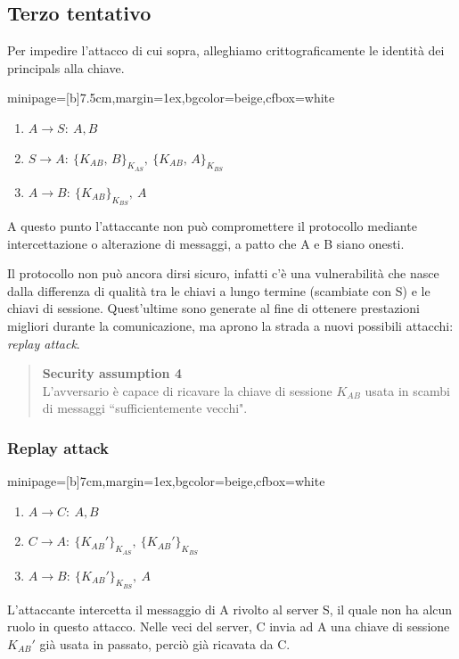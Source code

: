 \documentclass[a4paper, 11pt, notitlepage, fleqn]{report}
\newcommand{\fromto}[2]{#1\rightarrow #2\!:\ }
\newenvironment{colbox}[2]%
{%
	\par\noindent\hspace{10pt}
	\begin{adjustbox}{minipage=[b]{#2},margin=1ex,bgcolor=#1,cfbox=white}
}{%
	\end{adjustbox}\newline%
}
\begin{document}
\subsection{Terzo tentativo}
Per impedire l'attacco di cui sopra, alleghiamo crittograficamente le identità dei principals alla chiave.
\begin{colbox}{beige}{7.5cm}
	\begin{enumerate}
		\item $\fromto{A}{S}A, B$
		\item $\fromto{S}{A}\{K_{AB},\,B\}_{K_{AS}},\ \{K_{AB},\,A\}_{K_{BS}}$
		\item $\fromto{A}{B}\{K_{AB}\}_{K_{BS}},\ A$
	\end{enumerate}
\end{colbox}
A questo punto l'attaccante non può compromettere il protocollo mediante intercettazione o alterazione di messaggi, a patto che A e B siano onesti.

Il protocollo non può ancora dirsi sicuro, infatti c'è una vulnerabilità che nasce dalla differenza di qualità tra le chiavi a lungo termine (scambiate con S) e le chiavi di sessione. Quest'ultime sono generate al fine di ottenere prestazioni migliori durante la comunicazione, ma aprono la strada a nuovi possibili attacchi: \emph{replay attack}.
\begin{quote}
	\textbf{Security assumption 4}\\
	L'avversario è capace di ricavare la chiave di sessione $K_{AB}$ usata in scambi di messaggi ``sufficientemente vecchi".
\end{quote}

\subsubsection{Replay attack}
\begin{colbox}{beige}{7cm}
	\begin{enumerate}
		\item $\fromto{A}{C}A, B$
		\item $\fromto{C}{A}\{K_{AB}'\}_{K_{AS}},\ \{K_{AB}'\}_{K_{BS}}$
		\item $\fromto{A}{B}\{K_{AB}'\}_{K_{BS}},\ A$
	\end{enumerate}
\end{colbox}
L'attaccante intercetta il messaggio di A rivolto al server S, il quale non ha alcun ruolo in questo attacco. Nelle veci del server, C invia ad A una chiave di sessione $K_{AB}'$ già usata in passato, perciò già ricavata da C.
\end{document}
